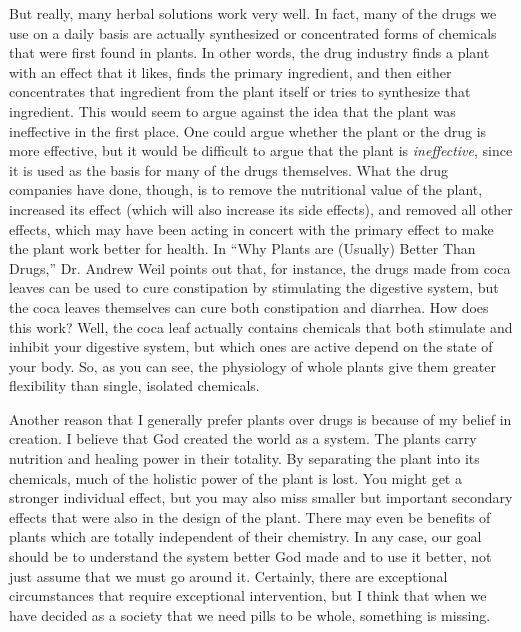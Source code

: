 \documentclass[letterpaper]{article}
\begin{document}
{\color{black}
But really, many herbal solutions work very well.  In fact, many of the
drugs we use on a daily basis are actually synthesized or concentrated
forms of chemicals that were first found in plants. In other words, the
drug industry finds a plant with an effect that it likes, finds the
primary ingredient, and then either concentrates that ingredient from
the plant itself or tries to synthesize that ingredient.  This would
seem to argue against the idea that the plant was ineffective in the
first place. One could argue whether the plant or the drug is more
effective, but it would be difficult to argue that the plant is
\textit{ineffective}, since it is used as the basis for many of the
drugs themselves.  What the drug companies have done, though, is to
remove the nutritional value of the plant, increased its effect (which
will also increase its side effects), and removed all other effects,
which may have been acting in concert with the primary effect to make
the plant work better for health.  In “Why Plants are (Usually) Better
Than Drugs,” Dr. Andrew Weil points out that, for instance, the drugs
made from coca leaves can be used to cure constipation by stimulating
the digestive system, but the coca leaves themselves can cure both
constipation and diarrhea.  How does this work?  Well, the coca leaf
actually contains chemicals that both stimulate and inhibit your
digestive system, but which ones are active depend on the state of your
body.  So, as you can see, the physiology of whole plants give them
greater flexibility than single, isolated chemicals. }

{\color{black}
 Another reason that I generally prefer plants over drugs is because of
my belief in creation. I believe that God created the world as a
system. The plants carry nutrition and healing power in their totality.
By separating the plant into its chemicals, much of the holistic power
of the plant is lost. You might get a stronger individual effect, but
you may also miss smaller but important secondary effects that were
also in the design of the plant. There may even be benefits of plants
which are totally independent of their chemistry.  In any case, our
goal should be to understand the system better God made and to use it
better, not just assume that we must go around it. Certainly, there are
exceptional circumstances that require exceptional intervention, but I
think that when we have decided as a society that we need pills to be
whole, something is missing.}
\end{document}

